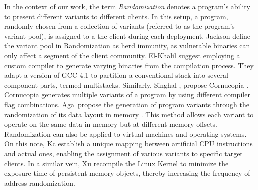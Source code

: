 \begin{strategy}[Randomization]
    \label{randomization}
    In the context of our work, the term \emph{Randomization} denotes a program's ability to present different variants to different clients. 
    In this setup, a program, randomly chosen from a collection of variants (referred to as the program's variant pool), is assigned to a the client during each deployment. 
    Jackson \etal \cite{jackson} define the variant pool in Randomization as herd immunity, as vulnerable binaries can only affect a segment of the client community. 
    El-Khalil \etal \cite{ElKhalil2004} suggest employing a custom compiler to generate varying binaries from the compilation process. 
    They adapt a version of GCC 4.1 to partition a conventional stack into several component parts, termed multistacks. 
    Similarly, Singhal \etal, propose Cornucopia \cite{cornucopia}.
    Cornucopia generates multiple variants of a program by using different compiler flag combinations.
    Aga~\etal propose the generation of program variants through the randomization of its data layout in memory \cite{aga2019smokestack}. 
    This method allows each variant to operate on the same data in memory but at different memory offsets. 
    Randomization can also be applied to virtual machines and operating systems. On this note, Kc \etal \cite{Kc03} establish a unique mapping between artificial CPU instructions and actual ones, enabling the assignment of various variants to specific target clients. 
    In a similar vein, Xu \etal \cite{xu2020merr} recompile the Linux Kernel to minimize the exposure time of persistent memory objects, thereby increasing the frequency of address randomization.
\end{strategy}


